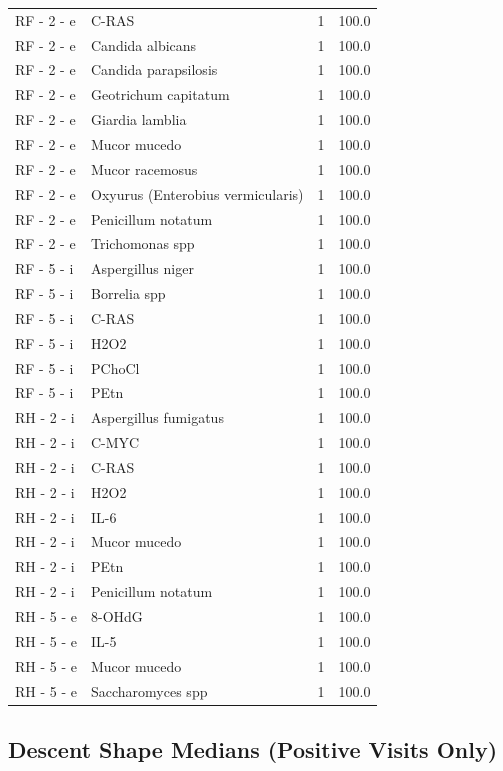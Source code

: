 \documentclass[a4paper,11pt]{article}
\begin{document}
\begin{footnotesize}
\begin{longtable}{p{3.5cm}p{7.5cm}rr}
RF - 2 - e & C-RAS & 1 & 100.0 \\
RF - 2 - e & Candida albicans & 1 & 100.0 \\
RF - 2 - e & Candida parapsilosis & 1 & 100.0 \\
RF - 2 - e & Geotrichum capitatum & 1 & 100.0 \\
RF - 2 - e & Giardia lamblia & 1 & 100.0 \\
RF - 2 - e & Mucor mucedo & 1 & 100.0 \\
RF - 2 - e & Mucor racemosus & 1 & 100.0 \\
RF - 2 - e & Oxyurus (Enterobius vermicularis) & 1 & 100.0 \\
RF - 2 - e & Penicillum notatum & 1 & 100.0 \\
RF - 2 - e & Trichomonas spp & 1 & 100.0 \\
RF - 5 - i & Aspergillus niger & 1 & 100.0 \\
RF - 5 - i & Borrelia spp & 1 & 100.0 \\
RF - 5 - i & C-RAS & 1 & 100.0 \\
RF - 5 - i & H2O2 & 1 & 100.0 \\
RF - 5 - i & PChoCl & 1 & 100.0 \\
RF - 5 - i & PEtn & 1 & 100.0 \\
RH - 2 - i & Aspergillus fumigatus & 1 & 100.0 \\
RH - 2 - i & C-MYC & 1 & 100.0 \\
RH - 2 - i & C-RAS & 1 & 100.0 \\
RH - 2 - i & H2O2 & 1 & 100.0 \\
RH - 2 - i & IL-6 & 1 & 100.0 \\
RH - 2 - i & Mucor mucedo & 1 & 100.0 \\
RH - 2 - i & PEtn & 1 & 100.0 \\
RH - 2 - i & Penicillum notatum & 1 & 100.0 \\
RH - 5 - e & 8-OHdG & 1 & 100.0 \\
RH - 5 - e & IL-5 & 1 & 100.0 \\
RH - 5 - e & Mucor mucedo & 1 & 100.0 \\
RH - 5 - e & Saccharomyces spp & 1 & 100.0 \\
\end{longtable}
\end{footnotesize}

\subsection{Descent Shape Medians (Positive Visits Only)}
\end{document}
